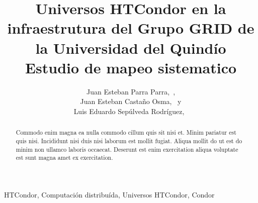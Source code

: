 \documentclass[]{IEEEtran}
\begin{document}
\title{
    Universos HTCondor en la infraestrutura del Grupo GRID de la
    Universidad del Quindío \\
    Estudio de mapeo sistematico
}

\author{
    Juan Esteban Parra Parra,~, \\
    Juan Esteban Castaño Osma,~ y \\
    Luis Eduardo Sepúlveda Rodríguez,~
}



\maketitle

\begin{abstract}
Commodo enim magna ea nulla commodo cillum quis sit nisi et. Minim pariatur est quis nisi. Incididunt nisi duis nisi laborum est mollit fugiat. Aliqua mollit do ut est do minim non ullamco laboris occaecat. Deserunt est enim exercitation aliqua voluptate est sunt magna amet ex exercitation.
\end{abstract}


\begin{IEEEkeywords}
HTCondor, Computación distribuída, Universos HTCondor, Condor
\end{IEEEkeywords}





\end{document}
